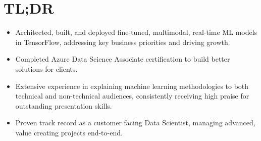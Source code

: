 \section{TL;DR}
\begin{itemize}
    \item Architected, built, and deployed fine-tuned, multimodal, real-time ML models in TensorFlow, addressing key business priorities and driving growth.
    \item Completed Azure Data Science Associate certification to build better solutions for clients.
    \item Extensive experience in explaining machine learning methodologies to both technical and non-technical audiences, consistently receiving high praise for outstanding presentation skills.
    \item Proven track record as a customer facing Data Scientist, managing advanced, value creating projects end-to-end.
\end{itemize}